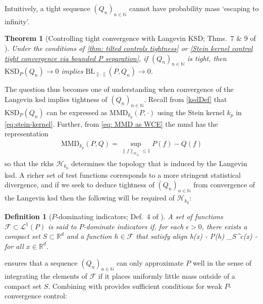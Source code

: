 \documentclass[12pt,paper=letter]{scrreprt}
\newtheorem{theorem}{Theorem}[chapter]
\newtheorem{definition}{Definition}[chapter]
\newcommand{\eps}{\epsilon}
\newenvironment{talign}
 {\let\displaystyle\textstyle\csname align\endcsname}
 {\endalign}
\def\F{\mathcal{F}}
\begin{document}
\noindent Intuitively, a tight sequence $(Q_n)_{n \in \mathbb{N}}$ cannot have probability mass `escaping to infinity'.

\begin{theorem}[Controlling tight convergence with Langevin KSD; Thms.~7 \& 9 of \citealp{barp2022targeted}] \label{thm: ctrl tight con}
    Under the conditions of \cref{thm: tilted controls tightness} or \ref{Stein kernel control tight convergence via bounded P separation}, if $(Q_n)_{n \in \mathbb{N}}$ is tight, then $\mathrm{KSD}_P(Q_n) \rightarrow 0$ implies $\mathrm{BL}_{\| \cdot\|}(P,Q_n) \rightarrow 0$.
\end{theorem}

The question thus becomes one of understanding when convergence of the Langevin \ac{ksd} implies tightness of $(Q_n)_{n \in \mathbb{N}}$.
Recall from \eqref{ksdDef} that $\mathrm{KSD}_P(Q_n)$ can be expressed as $\mathrm{MMD}_{k_p}(P,\cdot)$ using the Stein kernel $k_p$ in \eqref{eq:stein-kernel}.
Further, from \eqref{eq: MMD as WCE} the \ac{mmd} has the representation
\begin{align*}
    \mathrm{MMD}_{k_p}(P,Q) = \sup_{\|f\|_{\mathcal{H}_{k_p}} \leq 1} P(f) - Q(f) 
\end{align*}
so that the \ac{rkhs} $\mathcal{H}_{k_p}$ determines the topology that is induced by the Langevin \ac{ksd}.
A richer set of test functions corresponds to a more stringent statistical divergence, and if we seek to deduce tightness of $(Q_n)_{n \in \mathbb{N}}$ from convergence of the Langevin \ac{ksd} then the following will be required of $\mathcal{H}_{k_p}$: 


\begin{definition}[$P$-dominating indicators; Def.~4 of \citealp{barp2022targeted}]\label{def:indic-approx}
A set of  functions $\F \subset \mathcal{L}^1(P)$ is said to \emph{$P$-dominate indicators} if, for each $\epsilon > 0$, there exists a compact set $S \subset \mathbb{R}^d$ and a function $h \in \F$ that satisfy
\begin{talign}
h(x) - P(h) \geq {}_{S^c}(x) - \eps \label{eq:indic-approx}
\end{talign}
for all $x \in \mathbb{R}^d$.
\end{definition}

\noindent {} ensures that a sequence $(Q_n)_{n \in \mathbb{N}}$ can only approximate $P$ well in the sense of integrating the elements of $\mathcal{F}$ if it places uniformly little mass outside of a compact set $S$.
Combining  with  provides sufficient conditions for weak $P$-convergence control:
\end{document}
